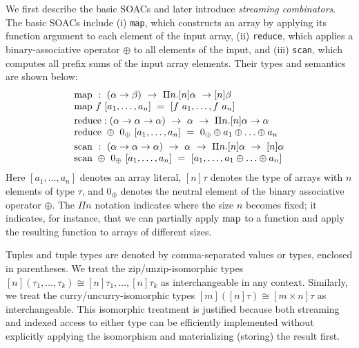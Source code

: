 We first describe the basic SOACs and later introduce
\textit{streaming combinators}. The basic SOACs include (i)
\lstinline{map}, which constructs an array by applying its function argument to
each element of the input array, (ii) \lstinline{reduce}, which applies a
binary-associative operator $\oplus$ to all elements of the input,
and (iii) \lstinline{scan}, which computes all prefix sums of the
input array elements.  Their types and semantics are shown below:
%
\[ \begin{array}{l}
\map ~ : ~ (\alpha \to \beta) ~ \to ~ \Pi n. [n]\alpha ~ \to [n]\beta \\
\map ~ f ~ [a_1, \ldots, a_n] ~ = ~ [f ~ a_1, \ldots, f ~ a_n]\smallskip\\
\reduce : (\alpha \to \alpha \to \alpha) ~ \to ~ \alpha ~ \to ~ \Pi n.[n]\alpha \to \alpha\\
\reduce ~ \oplus ~ 0_{\oplus} ~ [a_1, \ldots, a_n] ~ = ~ 0_{\oplus} \oplus a_1 \oplus \ldots \oplus a_n\smallskip\\
\scan ~ : ~ (\alpha \to \alpha \to \alpha) ~ \to ~ \alpha ~ \to ~ \Pi n.[n]\alpha ~ \to ~ [n]\alpha\\
\scan ~ \oplus ~ 0_{\oplus} ~ [a_1, \ldots, a_n] ~ = ~ [a_1, \ldots, a_1 \oplus \ldots \oplus a_n]\\
\end{array} \]
\noindent Here $[a_1, \ldots, a_n]$ denotes an array literal,
$[n]\tau$ denotes the type of arrays with $n$ elements of type $\tau$,
and $0_{\oplus}$ denotes the neutral element of the binary associative
operator $\oplus$.  The $\Pi n$ notation indicates where the size $n$
becomes fixed; it indicates, for instance, that we can partially apply
$\mathrm{map}$ to a function and apply the resulting function to arrays of
different sizes.

Tuples and tuple types are denoted by comma-separated values or types,
enclosed in parentheses. We treat the zip/unzip-isomorphic types
$[n](\tau_1, \ldots, \tau_k) \cong [n]\tau_1 , \ldots , [n]\tau_k$ as
interchangeable in any context.  Similarly, we treat the
curry/uncurry-isomorphic types $[m]([n]\tau) \cong [m \times n]\tau$
as interchangeable.  This isomorphic treatment is justified because
both streaming and indexed access to either type can be efficiently
implemented without explicitly applying the isomorphism and
materializing (storing) the result first.
%

%

